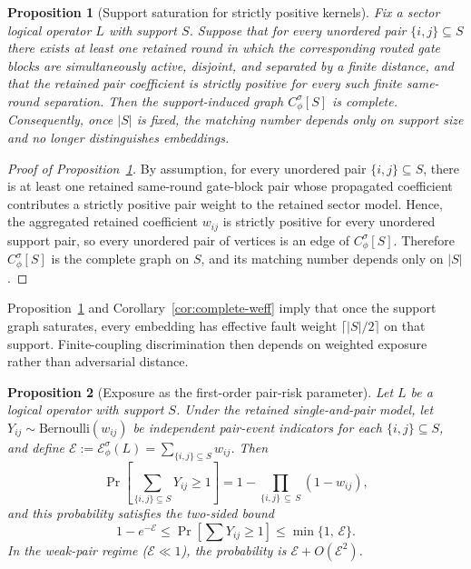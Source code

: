 \documentclass[
aps,
prx,
10pt,
twocolumn,
groupedaddress,
longbibliography,
nofootinbib,
floatfix
]{revtex4-2}
\newtheorem{proposition}{Proposition}
\theoremstyle{definition}
\newcommand{\Ew}{\mathcal{E}}
\begin{document}
\begin{proposition}[Support saturation for strictly positive kernels]
\label{prop:saturation-main}
Fix a sector logical operator $L$ with support $S$. Suppose that for every unordered pair $\{i,j\}\subseteq S$ there exists at least one retained round in which the corresponding routed gate blocks are simultaneously active, disjoint, and separated by a finite distance, and that the retained pair coefficient is strictly positive for every such finite same-round separation. Then the support-induced graph $C_{\phi}^{\sigma}[S]$ is complete. Consequently, once $|S|$ is fixed, the matching number depends only on support size and no longer distinguishes embeddings.
\end{proposition}

\begin{proof}[Proof of Proposition~\ref{prop:saturation-main}]
By assumption, for every unordered pair $\{i,j\}\subseteq S$, there is at least one retained same-round gate-block pair whose propagated coefficient contributes a strictly positive pair weight to the retained sector model. Hence, the aggregated retained coefficient $w_{ij}$ is strictly positive for every unordered support pair, so every unordered pair of vertices is an edge of $C_{\phi}^{\sigma}[S]$. Therefore $C_{\phi}^{\sigma}[S]$ is the complete graph on $S$, and its matching number depends only on $|S|$.
\end{proof}

Proposition~\ref{prop:saturation-main} and Corollary~\ref{cor:complete-weff} imply that once the support graph saturates, every embedding has effective fault weight $\lceil|S|/2\rceil$ on that support. Finite-coupling discrimination then depends on weighted exposure rather than adversarial distance.

\begin{proposition}[Exposure as the first-order pair-risk parameter]
\label{prop:union}
Let $L$ be a logical operator with support $S$. Under the retained single-and-pair model, let $Y_{ij}\sim\mathrm{Bernoulli}(w_{ij})$ be independent pair-event indicators for each $\{i,j\}\subseteq S$, and define $\Ew:=\Ew_{\phi}^{\sigma}(L)=\sum_{\{i,j\}\subseteq S}w_{ij}$. Then
\begin{equation}
\Pr\!\left[\textstyle\sum_{\{i,j\}\subseteq S} Y_{ij}\ge 1\right]=1-\prod_{\{i,j\}\,\subseteq\, S}\left(1-w_{ij}\right),
\label{eq:exact-pair-risk}
\end{equation}
and this probability satisfies the two-sided bound
\begin{equation}
1-e^{-\Ew}\le\Pr\!\left[\textstyle\sum Y_{ij}\ge 1\right]\le\min\{1,\,\Ew\}.
\label{eq:two-sided}
\end{equation}
In the weak-pair regime ($\Ew\ll 1$), the probability is $\Ew+O(\Ew^2)$.
\end{proposition}
\end{document}
